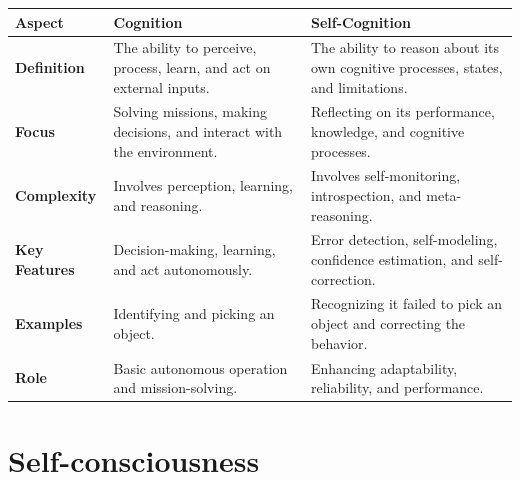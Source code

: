 \begin{tabular}{|l|l|l|}
    \hline
    \textbf{Aspect}       & \textbf{Cognition}                                                     & \textbf{Self-Cognition}                                                           \\ \hline
    \textbf{Definition}   & The ability to perceive, process, learn, and act on external inputs. & The ability to reason about its own cognitive processes, states, and limitations. \\ \hline
    \textbf{Focus}        & Solving missions, making decisions, and interact with the environment. & Reflecting on its performance, knowledge, and cognitive processes. \\ \hline
    \textbf{Complexity}   & Involves perception, learning, and reasoning.                          & Involves self-monitoring, introspection, and meta-reasoning.                      \\ \hline
    \textbf{Key Features} & Decision-making, learning, and act autonomously.                    & Error detection, self-modeling, confidence estimation, and self-correction.       \\ \hline
    \textbf{Examples}     & Identifying and picking an object.                                     & Recognizing it failed to pick an object and correcting the behavior.              \\ \hline
    \textbf{Role}         & Basic autonomous operation and mission-solving.                           & Enhancing adaptability, reliability, and performance.                             \\ \hline
\end{tabular}


\section{Self-consciousness}


